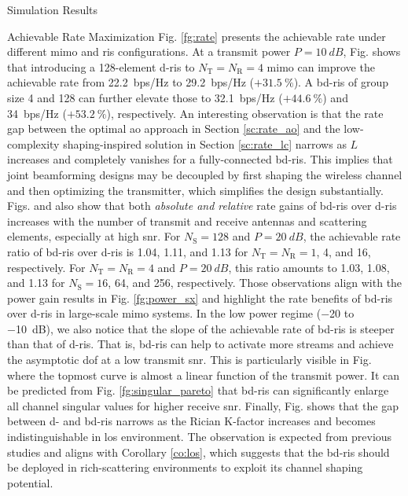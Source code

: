 \documentclass[journal]{IEEEtran}
\begin{document}
\begin{section}{Simulation Results}
\begin{subsection}{Achievable Rate Maximization}
		Fig. \ref{fg:rate} presents the achievable rate under different \gls{mimo} and \gls{ris} configurations.
		At a transmit power $P = \qty{10}{dB}$, Fig.  shows that introducing a 128-element \gls{d}-\gls{ris} to $N_\mathrm{T}=N_\mathrm{R}=4$ \gls{mimo} can improve the achievable rate from \qty{22.2}{bps/Hz} to \qty{29.2}{bps/Hz} ($+\qty{31.5}{\percent}$).
		A \gls{bd}-\gls{ris} of group size 4 and 128 can further elevate those to \qty{32.1}{bps/Hz} ($+\qty{44.6}{\percent}$) and \qty{34}{bps/Hz}  ($+\qty{53.2}{\percent}$), respectively.
		An interesting observation is that the rate gap between the optimal \gls{ao} approach in Section \ref{sc:rate_ao} and the low-complexity shaping-inspired solution in Section \ref{sc:rate_lc} narrows as $L$ increases and completely vanishes for a fully-connected \gls{bd}-\gls{ris}.
		This implies that joint beamforming designs may be decoupled by first shaping the wireless channel and then optimizing the transmitter, which simplifies the design substantially.
		Figs.  and  also show that both \emph{absolute and relative} rate gains of \gls{bd}-\gls{ris} over \gls{d}-\gls{ris}
		increases with the number of transmit and receive antennas and scattering elements, especially at high \gls{snr}.
		For $N_\mathrm{S}=128$ and $P = \qty{20}{dB}$,
		the achievable rate ratio of \gls{bd}-\gls{ris} over \gls{d}-\gls{ris} is \num{1.04}, \num{1.11}, and \num{1.13} for $N_\mathrm{T}=N_\mathrm{R}=1$, \num{4}, and \num{16}, respectively.
		For $N_\mathrm{T}=N_\mathrm{R}=4$ and $P = \qty{20}{dB}$, this ratio amounts to \num{1.03}, \num{1.08}, and \num{1.13} for $N_\mathrm{S}=16$, \num{64}, and \num{256}, respectively.
		Those observations align with the power gain results in Fig. \ref{fg:power_sx} and highlight the rate benefits of \gls{bd}-\gls{ris} over \gls{d}-\gls{ris} in large-scale \gls{mimo} systems.
		In the low power regime (\num{-20} to \qty{-10}{dB}), we also notice that the slope of the achievable rate of \gls{bd}-\gls{ris} is steeper than that of \gls{d}-\gls{ris}.
		That is, \gls{bd}-\gls{ris} can help to activate more streams and achieve the asymptotic \gls{dof} at a low transmit \gls{snr}.
		This is particularly visible in Fig.  where the topmost curve is almost a linear function of the transmit power.
		It can be predicted from Fig. \ref{fg:singular_pareto} that \gls{bd}-\gls{ris} can significantly enlarge all channel singular values for higher receive \gls{snr}.
		Finally, Fig.  shows that the gap between \gls{d}- and \gls{bd}-\gls{ris} narrows as the Rician K-factor increases and becomes indistinguishable in \gls{los} environment.
		The observation is expected from previous studies \cite{Shen2020a,Nerini2023} and aligns with Corollary \ref{co:los}, which suggests that the \gls{bd}-\gls{ris} should be deployed in rich-scattering environments to exploit its channel shaping potential.


\end{subsection}
\end{section}
\end{document}
